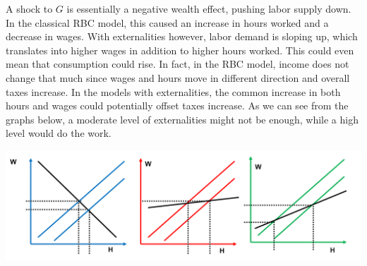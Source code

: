 \documentclass[12pt]{report}
\begin{document}
A shock to $G$ is essentially a negative wealth effect, pushing labor supply down. In the classical RBC model, this caused an increase in hours worked and a decrease in wages. With externalities however, labor demand is sloping up, which translates into higher wages in addition to higher hours worked. This could even mean that consumption could rise. In fact, in the RBC model, income does not change that much since wages and hours move in different direction and overall taxes increase. In the models with externalities, the common increase in both hours and wages could potentially offset taxes increase. As we can see from the graphs below, a moderate level of externalities might not be enough, while a high level would do the work.\begin{center}
\includegraphics[scale=0.275]{images/RBC3-gshock0.PNG} 
\end{center}
\end{document}
